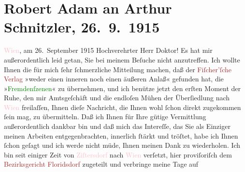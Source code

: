 

               \section[Robert Adam an Arthur Schnitzler, 26. 9. 1915]{ Robert Adam an Arthur Schnitzler, 26. 9. 1915}\nopagebreak{}\rehead{ }\normalsize\beginnumbering{} \toendnotes[C]{\smallbreak\pagebreak[2]} 
\pstart
           \raggedleft{}{\pb}\textcolor{pink}{Wien}{}\ledrightnote{\textcolor{pink}{Wien}}, am 26. September 1915\pend
           \pstart{}Hochverehrter Herr Doktor!\pend\pstart
           Es hat mir außerordentlich leid getan, Sie bei meinem Beſuche nicht anzutreffen. Ich
               wollte Ihnen die für mich ſehr ſchmerzliche Mitteilung machen, daß der \textcolor{brown}{Fiſcher’ſche Verlag}{}\ledrightnote{\textcolor{brown}{S. Fischer Verlag}} »weder einen inneren noch einen
               äußeren Anlaß« gefunden hat, die »\textcolor{green}{Fremdenſzenen}{}\ledrightnote{\textcolor{green}{Der Fremde}}« zu
               übernehmen, und ich benütze jetzt den erſten Moment der Ruhe, den mir Amtsgeſchäft
               und die endloſen Mühen der Überſiedlung nach \textcolor{pink}{Wien}{}\ledrightnote{\textcolor{pink}{Wien}}
               freilaſſen, Ihnen dieſe Nachricht, die Ihnen wohl ſchon direkt zugekommen ſein mag,
               zu übermitteln.\pend
           \pstart
           Daß ich Ihnen für Ihre gütige Vermittlung außerordentlich dankbar bin und daß mich
               das {\pb}Intereſſe, das Sie als Einziger meinen Arbeiten
               entgegenbrachten, innerlich ſtärkt und tröſtet, habe ich Ihnen ſchon geſagt und ich
               werde nicht müde, Ihnen meinen Dank zu wiederholen.\pend
           \pstart
           Ich bin seit einiger Zeit von \textcolor{pink}{Ziſtersdorf}{}\ledrightnote{\textcolor{pink}{Zistersdorf}} nach \textcolor{pink}{Wien}{}\ledrightnote{\textcolor{pink}{Wien}} verſetzt, hier proviſoriſch dem \textcolor{brown}{Bezirksgericht Floridsdorf}{}\ledrightnote{\textcolor{brown}{Bezirksgericht Wien Floridsdorf}} zugeteilt und verbringe meine Tage auf

